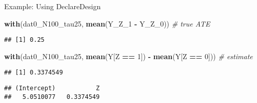 \documentclass[
  ignorenonframetext,
]{beamer}
\newenvironment{Shaded}{\begin{snugshade}}{\end{snugshade}}
\newcommand{\CommentTok}[1]{\textcolor[rgb]{0.56,0.35,0.01}{\textit{#1}}}
\newcommand{\DataTypeTok}[1]{\textcolor[rgb]{0.13,0.29,0.53}{#1}}
\newcommand{\DecValTok}[1]{\textcolor[rgb]{0.00,0.00,0.81}{#1}}
\newcommand{\KeywordTok}[1]{\textcolor[rgb]{0.13,0.29,0.53}{\textbf{#1}}}
\newcommand{\NormalTok}[1]{#1}
\newcommand{\OperatorTok}[1]{\textcolor[rgb]{0.81,0.36,0.00}{\textbf{#1}}}
\newcommand{\StringTok}[1]{\textcolor[rgb]{0.31,0.60,0.02}{#1}}
\begin{document}
\begin{frame}[fragile]{Example: Using DeclareDesign}
\protect\hypertarget{example-using-declaredesign-2}{}
\begin{Shaded}
\begin{Highlighting}[]
\KeywordTok{with}\NormalTok{(dat0\_N100\_tau25, }\KeywordTok{mean}\NormalTok{(Y\_Z\_}\DecValTok{1} \OperatorTok{{-}}\StringTok{ }\NormalTok{Y\_Z\_}\DecValTok{0}\NormalTok{))  }\CommentTok{\# true ATE}
\end{Highlighting}
\end{Shaded}

\begin{verbatim}
## [1] 0.25
\end{verbatim}

\begin{Shaded}
\begin{Highlighting}[]
\KeywordTok{with}\NormalTok{(dat0\_N100\_tau25, }\KeywordTok{mean}\NormalTok{(Y[Z }\OperatorTok{==}\StringTok{ }\DecValTok{1}\NormalTok{]) }\OperatorTok{{-}}\StringTok{ }\KeywordTok{mean}\NormalTok{(Y[Z }\OperatorTok{==}
\StringTok{    }\DecValTok{0}\NormalTok{]))  }\CommentTok{\# estimate}
\end{Highlighting}
\end{Shaded}

\begin{verbatim}
## [1] 0.3374549
\end{verbatim}

\begin{Shaded}
\end{Shaded}

\begin{verbatim}
## (Intercept)           Z 
##   5.0510077   0.3374549
\end{verbatim}
\end{frame}
\end{document}
